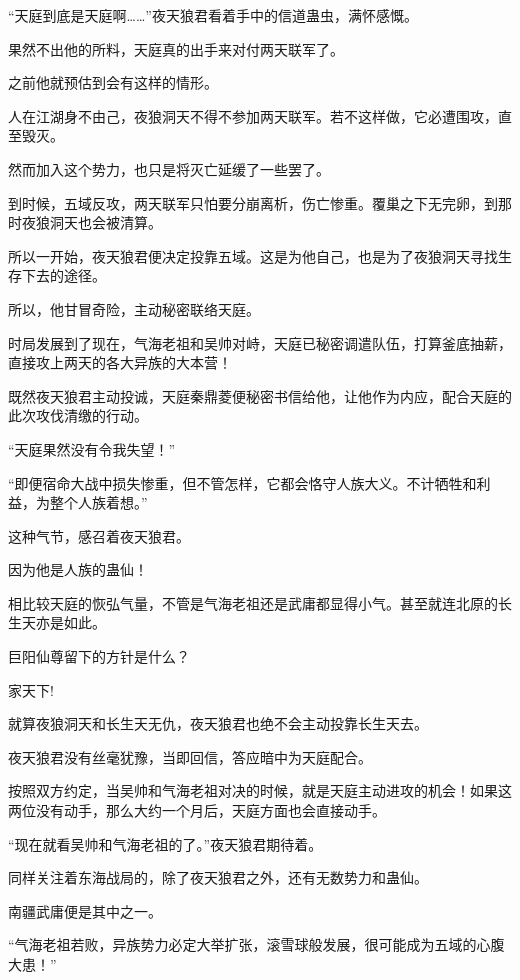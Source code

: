 
\begin{this_body}

“天庭到底是天庭啊……”夜天狼君看着手中的信道蛊虫，满怀感慨。

果然不出他的所料，天庭真的出手来对付两天联军了。

之前他就预估到会有这样的情形。

人在江湖身不由己，夜狼洞天不得不参加两天联军。若不这样做，它必遭围攻，直至毁灭。

然而加入这个势力，也只是将灭亡延缓了一些罢了。

到时候，五域反攻，两天联军只怕要分崩离析，伤亡惨重。覆巢之下无完卵，到那时夜狼洞天也会被清算。

所以一开始，夜天狼君便决定投靠五域。这是为他自己，也是为了夜狼洞天寻找生存下去的途径。

所以，他甘冒奇险，主动秘密联络天庭。

时局发展到了现在，气海老祖和吴帅对峙，天庭已秘密调遣队伍，打算釜底抽薪，直接攻上两天的各大异族的大本营！

既然夜天狼君主动投诚，天庭秦鼎菱便秘密书信给他，让他作为内应，配合天庭的此次攻伐清缴的行动。

“天庭果然没有令我失望！”

“即便宿命大战中损失惨重，但不管怎样，它都会恪守人族大义。不计牺牲和利益，为整个人族着想。”

这种气节，感召着夜天狼君。

因为他是人族的蛊仙！

相比较天庭的恢弘气量，不管是气海老祖还是武庸都显得小气。甚至就连北原的长生天亦是如此。

巨阳仙尊留下的方针是什么？

家天下!

就算夜狼洞天和长生天无仇，夜天狼君也绝不会主动投靠长生天去。

夜天狼君没有丝毫犹豫，当即回信，答应暗中为天庭配合。

按照双方约定，当吴帅和气海老祖对决的时候，就是天庭主动进攻的机会！如果这两位没有动手，那么大约一个月后，天庭方面也会直接动手。

“现在就看吴帅和气海老祖的了。”夜天狼君期待着。

同样关注着东海战局的，除了夜天狼君之外，还有无数势力和蛊仙。

南疆武庸便是其中之一。

“气海老祖若败，异族势力必定大举扩张，滚雪球般发展，很可能成为五域的心腹大患！”


\end{this_body}
